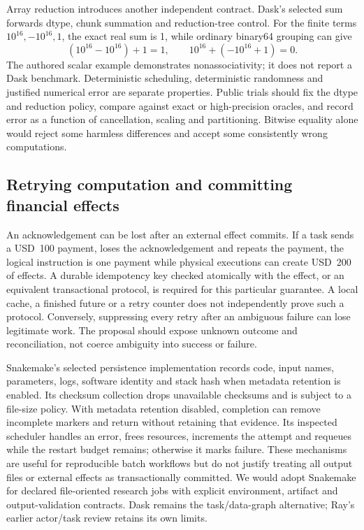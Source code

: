 Array reduction introduces another independent contract. Dask's selected sum forwards dtype, chunk summation and reduction-tree control. For the finite terms $10^{16},-10^{16},1$, the exact real sum is 1, while ordinary binary64 grouping can give
\[
 (10^{16}-10^{16})+1=1,\qquad
 10^{16}+(-10^{16}+1)=0.
\]
The authored scalar example demonstrates nonassociativity; it does not report a Dask benchmark. Deterministic scheduling, deterministic randomness and justified numerical error are separate properties. Public trials should fix the dtype and reduction policy, compare against exact or high-precision oracles, and record error as a function of cancellation, scaling and partitioning. Bitwise equality alone would reject some harmless differences and accept some consistently wrong computations.~\citep{exec25_dww_dask,exec25_dww_choice}

\subsection{Retrying computation and committing financial effects}

An acknowledgement can be lost after an external effect commits. If a task sends a USD~100 payment, loses the acknowledgement and repeats the payment, the logical instruction is one payment while physical executions can create USD~200 of effects. A durable idempotency key checked atomically with the effect, or an equivalent transactional protocol, is required for this particular guarantee. A local cache, a finished future or a retry counter does not independently prove such a protocol. Conversely, suppressing every retry after an ambiguous failure can lose legitimate work. The proposal should expose unknown outcome and reconciliation, not coerce ambiguity into success or failure.~\citep{exec25_dww_choice}

Snakemake's selected persistence implementation records code, input names, parameters, logs, software identity and stack hash when metadata retention is enabled. Its checksum collection drops unavailable checksums and is subject to a file-size policy. With metadata retention disabled, completion can remove incomplete markers and return without retaining that evidence. Its inspected scheduler handles an error, frees resources, increments the attempt and requeues while the restart budget remains; otherwise it marks failure. These mechanisms are useful for reproducible batch workflows but do not justify treating all output files or external effects as transactionally committed. We would adopt Snakemake for declared file-oriented research jobs with explicit environment, artifact and output-validation contracts. Dask remains the task/data-graph alternative; Ray's earlier actor/task review retains its own limits.~\citep{exec25_dww_snakemake,exec24_ray_sources,exec24_ray_contract}

